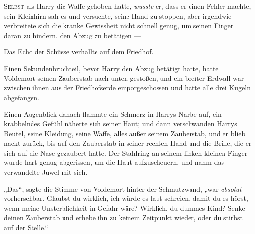 
\lettrine{S}{elbst} als Harry die Waffe gehoben hatte, \emph{wusste} er, dass er einen Fehler machte, sein Kleinhirn sah es und versuchte, seine Hand zu stoppen, aber irgendwie verbreitete sich die kranke Gewissheit nicht schnell genug, um seinen Finger daran zu hindern, den Abzug zu betätigen —

Das Echo der Schüsse verhallte auf dem Friedhof.

Einen Sekundenbruchteil, bevor Harry den Abzug betätigt hatte, hatte Voldemort seinen Zauberstab nach unten gestoßen, und ein breiter Erdwall war zwischen ihnen aus der Friedhofserde emporgeschossen und hatte alle drei Kugeln abgefangen.

Einen Augenblick danach flammte ein Schmerz in Harrys Narbe auf, ein krabbelndes Gefühl näherte sich seiner Haut; und dann verschwanden Harrys Beutel, seine Kleidung, seine Waffe, alles außer seinem Zauberstab, und er blieb nackt zurück, bis auf den Zauberstab in seiner rechten Hand und die Brille, die er sich auf die Nase gezaubert hatte. Der Stahlring an seinem linken kleinen Finger wurde hart genug abgerissen, um die Haut aufzuscheuern, und nahm das verwandelte Juwel mit sich.

„Das“, sagte die Stimme von Voldemort hinter der Schmutzwand, „war \emph{absolut} vorhersehbar. Glaubst du wirklich, ich würde es laut schreien, damit du es hörst, wenn meine Unsterblichkeit in Gefahr wäre? Wirklich, du dummes Kind? Senke deinen Zauberstab und erhebe ihn zu keinem Zeitpunkt wieder, oder du stirbst auf der Stelle.“

